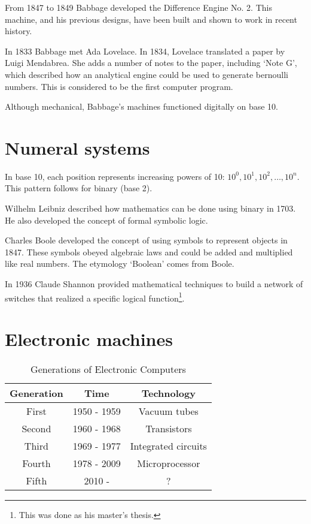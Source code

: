 From 1847 to 1849 Babbage developed the Difference Engine No. 2. This machine, and his previous designs, have been built and shown to work in recent history.

In 1833 Babbage met Ada Lovelace. In 1834, Lovelace translated a paper by Luigi Mendabrea. She adds a number of notes to the paper, including `Note G', which described how an analytical engine could be used to generate bernoulli numbers. This is considered to be the first computer program.

Although mechanical, Babbage's machines functioned digitally on base 10.

\section{Numeral systems}
In base 10, each position represents increasing powers of 10: \(10^0, 10^1, 10^2, \dots, 10^n\). This pattern follows for binary (base 2).

Wilhelm Leibniz described how mathematics can be done using binary in 1703. He also developed the concept of formal symbolic logic.

Charles Boole developed the concept of using symbols to represent objects in 1847. These symbols obeyed algebraic laws and could be added and multiplied like real numbers. The etymology `Boolean' comes from Boole.

In 1936 Claude Shannon provided mathematical techniques to build a network of switches that realized a specific logical function\footnote{This was done as his master's thesis.}.

\section{Electronic machines}

\begin{table}[htbp]
    \centering
    \begin{tabular}{ccc}
        \toprule
        \textbf{Generation} & \textbf{Time} & \textbf{Technology} \\
        \midrule
        First               & 1950 - 1959   & Vacuum tubes        \\
        Second              & 1960 - 1968   & Transistors         \\
        Third               & 1969 - 1977   & Integrated circuits \\
        Fourth              & 1978 - 2009   & Microprocessor      \\
        Fifth               & 2010 -        & ?                   \\
        \bottomrule
    \end{tabular}
    \caption{Generations of Electronic Computers}
    \label{tab:electronic_generations}
\end{table}

